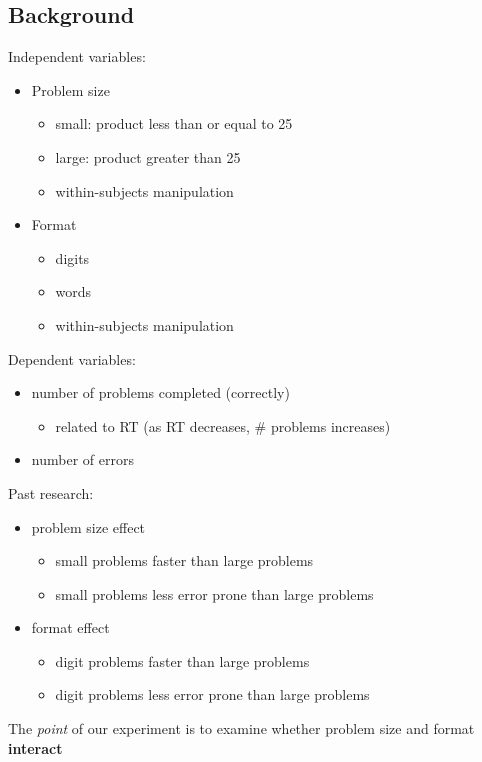 \documentclass[article,10pt]{article}
\begin{document}
\subsection*{Background}
\label{sec-4-1}
Independent variables:
\begin{itemize}
\item Problem size
\begin{itemize}
\item small: product less than or equal to 25
\item large: product greater than 25
\item within-subjects manipulation
\end{itemize}
\item Format
\begin{itemize}
\item digits
\item words
\item within-subjects manipulation
\end{itemize}
\end{itemize}

Dependent variables:
\begin{itemize}
\item number of problems completed (correctly)
\begin{itemize}
\item related to RT (as RT decreases, \# problems increases)
\end{itemize}
\item number of errors
\end{itemize}

Past research:
\begin{itemize}
\item problem size effect
\begin{itemize}
\item small problems faster than large problems
\item small problems less error prone than large problems
\end{itemize}
\item format effect
\begin{itemize}
\item digit problems faster than large problems
\item digit problems less error prone than large problems
\end{itemize}
\end{itemize}

The \emph{point} of our experiment is to examine whether problem size and format \textbf{interact}
\end{document}
